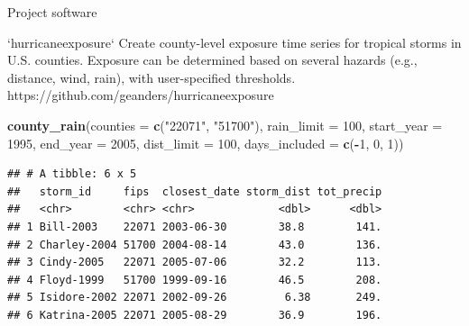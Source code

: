 \documentclass[ignorenonframetext,]{beamer}
\newenvironment{Shaded}{\begin{snugshade}}{\end{snugshade}}
\newcommand{\KeywordTok}[1]{\textcolor[rgb]{0.13,0.29,0.53}{\textbf{#1}}}
\newcommand{\DataTypeTok}[1]{\textcolor[rgb]{0.13,0.29,0.53}{#1}}
\newcommand{\DecValTok}[1]{\textcolor[rgb]{0.00,0.00,0.81}{#1}}
\newcommand{\StringTok}[1]{\textcolor[rgb]{0.31,0.60,0.02}{#1}}
\newcommand{\OperatorTok}[1]{\textcolor[rgb]{0.81,0.36,0.00}{\textbf{#1}}}
\newcommand{\NormalTok}[1]{#1}
\begin{document}
\begin{frame}[fragile]{Project software}

\footnotesize

\begin{block}{`hurricaneexposure`}
Create county-level exposure time series for tropical storms in U.S. counties. Exposure can be determined based on several hazards (e.g., distance, wind, rain), with user-specified thresholds. 
https://github.com/geanders/hurricaneexposure
\end{block}

\begin{Shaded}
\begin{Highlighting}[]
\KeywordTok{county_rain}\NormalTok{(}\DataTypeTok{counties =} \KeywordTok{c}\NormalTok{(}\StringTok{"22071"}\NormalTok{, }\StringTok{"51700"}\NormalTok{), }\DataTypeTok{rain_limit =} \DecValTok{100}\NormalTok{, }
            \DataTypeTok{start_year =} \DecValTok{1995}\NormalTok{, }\DataTypeTok{end_year =} \DecValTok{2005}\NormalTok{, }\DataTypeTok{dist_limit =} \DecValTok{100}\NormalTok{,}
            \DataTypeTok{days_included =} \KeywordTok{c}\NormalTok{(}\OperatorTok{-}\DecValTok{1}\NormalTok{, }\DecValTok{0}\NormalTok{, }\DecValTok{1}\NormalTok{))}
\end{Highlighting}
\end{Shaded}

\begin{verbatim}
## # A tibble: 6 x 5
##   storm_id     fips  closest_date storm_dist tot_precip
##   <chr>        <chr> <chr>             <dbl>      <dbl>
## 1 Bill-2003    22071 2003-06-30        38.8        141.
## 2 Charley-2004 51700 2004-08-14        43.0        136.
## 3 Cindy-2005   22071 2005-07-06        32.2        113.
## 4 Floyd-1999   51700 1999-09-16        46.5        208.
## 5 Isidore-2002 22071 2002-09-26         6.38       249.
## 6 Katrina-2005 22071 2005-08-29        36.9        196.
\end{verbatim}

\end{frame}
\end{document}
